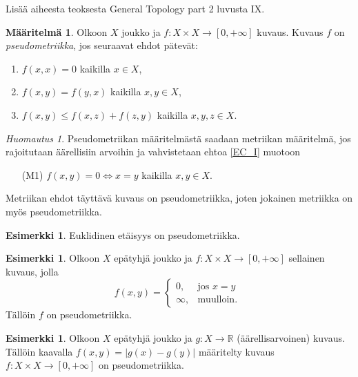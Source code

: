 \documentclass[12pt,a4paper,leqno]{report}
\newcommand{\R}{\mathbb{R}}
\theoremstyle{plain}
\theoremstyle{definition}
\newtheorem{maar}[equation]{Määritelmä}
\newtheorem{esim}[equation]{Esimerkki}
\theoremstyle{remark}
\newtheorem{huom}[equation]{Huomautus}
\begin{document}
Lisää aiheesta teoksesta General Topology part 2 \cite{Eom2} luvusta IX.
\begin{maar}\label{pseudo_maar}
Olkoon $X$ joukko ja $f\colon X\times X\rightarrow [0,+\infty]$ 
kuvaus. Kuvaus $f$ on \emph{pseudometriikka}, jos seuraavat ehdot pätevät:
\begin{enumerate} [label=(P\arabic*),ref=(P\arabic*)]
\item\label{EC_I} $f(x,x)=0$ kaikilla $x\in X$,
\item\label{EC_II} $f(x,y)=f(y,x)$ kaikilla $x,y\in X$,
\item\label{EC_III} $f(x,y)\leq f(x,z)+f(z,y)$ kaikilla $x,y,z\in X$.
\end{enumerate}
\end{maar}
\begin{huom}
Pseudometriikan määritelmästä saadaan metriikan määritelmä, jos rajoitutaan äärellisiin arvoihin ja vahvistetaan ehtoa \ref{EC_I} muotoon 
\begin{enumerate} %
\item[(M1)]\label{M1} $f(x,y)=0\Leftrightarrow x=y$ kaikilla $x,y\in X.$
\end{enumerate}
Metriikan ehdot täyttävä kuvaus on pseudometriikka, 
joten %
jokainen metriikka on myös pseudometriikka.
\end{huom}
\begin{esim}%
Euklidinen etäisyys on pseudometriikka.
\end{esim}
\begin{esim}%
Olkoon $X$ epätyhjä joukko ja $f\colon X\times X\rightarrow [0,+\infty]$ sellainen kuvaus, jolla
\begin{equation*}
f(x,y) = \begin{cases} 0, & \mbox{jos } x=y\\
\infty, & \mbox{muulloin. } \end{cases}
\end{equation*}
Tällöin $f$ on pseudometriikka.
\end{esim}
\begin{esim}%
Olkoon $X$ epätyhjä joukko ja $g\colon X\rightarrow \R$ (äärellisarvoinen) kuvaus. Tällöin kaavalla $f(x,y)=|g(x)-g(y)|$ määritelty kuvaus $f\colon X\times X\rightarrow[0,+\infty]$ on pseudometriikka.
\end{esim}
\end{document}
